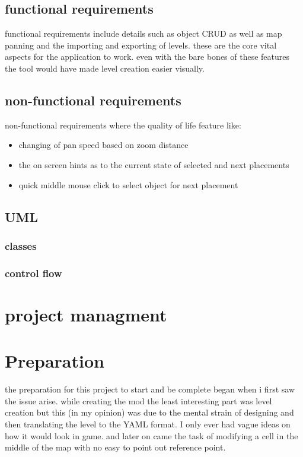 \subsection{functional requirements}
functional requirements include details such as object CRUD as well as map panning and the importing and exporting of levels. these are the core vital aspects for the application to work. even with the bare bones of these features the tool would have made level creation easier visually.

\subsection{non-functional requirements}
non-functional requirements where the quality of life feature like: 
\begin{itemize}
	\item changing of pan speed based on zoom distance
	\item the on screen hints as to the current state of selected and next placements
	\item quick middle mouse click to select object for next placement
\end{itemize}

\subsection{UML}
\subsubsection{classes}
\subsubsection{control flow}

\section{project managment}

\section{Preparation}
the preparation for this project to start and be complete began when i first saw the issue arise. while creating the mod the least interesting part was level creation but this (in my opinion) was due to the mental strain of designing and then translating the level to the YAML format. I only ever had vague ideas on how it would look in game. and later on came the task of modifying a cell in the middle of the map with no easy to point out reference point.
